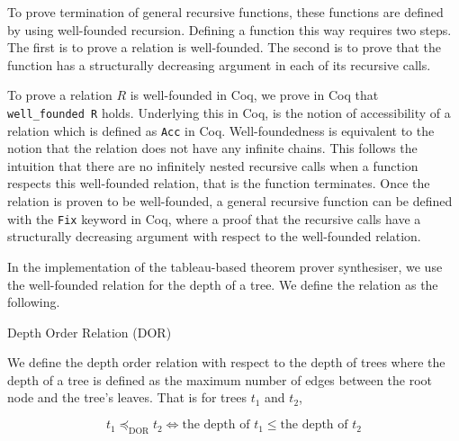 \documentclass{llncs}
\newcommand{\comment}[1]{}
\begin{document}
To prove termination of general recursive functions, these functions are
defined by using well-founded recursion. Defining a function this way requires
two steps. The first is to prove a relation is well-founded. The second is to
prove that the function has a structurally decreasing argument in each of its
recursive calls.

To prove a relation $R$ is well-founded in Coq, we prove in Coq that
\\\verb+well_founded R+ holds. Underlying this in Coq, is the notion of
accessibility of a relation which is defined as \verb+Acc+ in Coq.
Well-foundedness is equivalent to the notion that the relation does not have
any infinite chains. This follows the intuition that there are no infinitely
nested recursive calls when a function respects this well-founded relation,
that is the function terminates. Once the relation is proven to be
well-founded, a general recursive function can be defined with the \verb+Fix+
keyword in Coq, where a proof that the recursive calls have a structurally 
decreasing argument with respect to the well-founded relation.

In the implementation of the tableau-based theorem prover synthesiser, we use
the well-founded relation for the depth of a tree. We define the relation as
the following.

\comment{
we use
two main well-founded relations to define general recursive functions: the
length order of a list and the depth order of a tree like data structure.
We define the relations as the following.

\begin{definition}{Length Order Relation (LOR)}

We define the length order relation with respect to the length of lists.
That is for lists $l_1$ and $l_2$,

\begin{equation}
l_1 \preceq_{\textrm{LOR}} l_2 \iff \textrm{the
length of } l_1 \le \textrm{the length of } l_2
\label{lengthOrder}
\end{equation}
\end{definition}
}

\begin{definition}{Depth Order Relation (DOR)}

We define the depth order relation with respect to the depth of trees where the
depth of a tree is defined as the maximum number of edges between the root node
and the tree's leaves.
That is for trees $t_1$ and $t_2$,

\begin{equation}
t_1 \preceq_{\textrm{DOR}} t_2 \iff \textrm{the
depth of } t_1 \leq \textrm{the depth of } t_2
\label{depthOrder}
\end{equation}
\end{definition}
\end{document}
